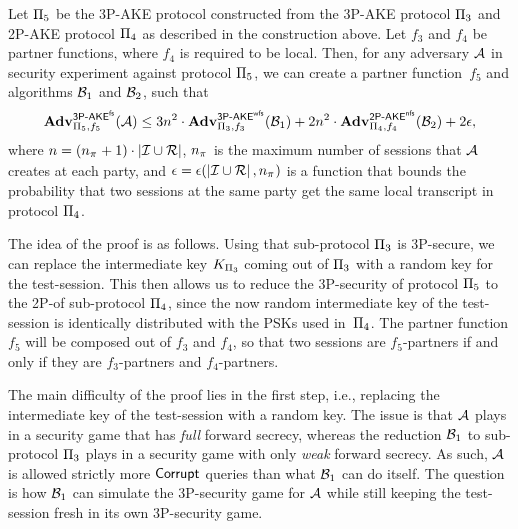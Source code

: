 \begin{theorem}\label{thm:protocol_5:3P-AKE}
Let $\protocol_5$ be the 3P-AKE protocol constructed from the 3P-AKE protocol $\protocol_3$ and 2P-AKE protocol $\protocol_4$ as described in the construction above.
Let $f_3$ and $f_4$ be partner functions,
where $f_4$ is required to be local.
Then,
for any adversary $\A$ in security experiment \akefstext against protocol $\protocol_5$,
we can create a partner function~$f_5$ and algorithms $\A[B]_1$ and $\A[B]_2$,
such that
\begin{equation}\label{eq:thm:P5:AKE}
	\adv_{\protocol_5,f_5}^{\operatorname{\mathsf{3P-\akefs}}} (\A) 
		\leq 3n^2 \cdot \adv_{\protocol_3,f_3}^{\operatorname{\mathsf{3P-\akewfs}}}(\A[B]_1) 
		+ 2n^2 \cdot \adv_{\protocol_4,f_4}^{\operatorname{\mathsf{2P-\akenfs}}}(\A[B]_2) + 2 \transcriptcollisionfunc, 
\end{equation}
where $n = (\numsessions+1) \cdot \left| \mathcal{I} \cup \mathcal{R} \right|$,
$\numsessions$ is the maximum number of sessions that $\A$ creates at each party,
and $\transcriptcollisionfunc = \transcriptcollisionfunc(\left| \mathcal{I} \cup \mathcal{R} \right|, \numsessions)$ is a function that bounds the probability that two sessions at the same party get the same local transcript in protocol $\protocol_4$.
\end{theorem}
\normalsize


The idea of the proof  is as follows.
Using that sub-protocol $\protocol_3$ is 3P-\akewfstext secure,
we can replace the intermediate key $\KDkey$ coming out of $\protocol_3$ with a random key for the test-session.
This then allows us to reduce the 3P-\akefstext security of protocol $\protocol_5$ to the 2P-\akenfstext of sub-protocol $\protocol_4$,
since the now random intermediate key of the test-session is identically distributed with the PSKs used in~$\protocol_4$. 
The partner function $f_5$ will be composed out of $f_3$ and $f_4$,
so that two sessions are $f_5$-partners if and only if they are $f_3$-partners and $f_4$-partners.

The main difficulty of the proof lies in the first step,
i.e., replacing the intermediate key of the test-session with a random key.
The issue is that $\A$ plays in a security game that has \emph{full} forward secrecy,
whereas the reduction $\A[B]_1$ to sub-protocol $\protocol_3$ plays in a security game with only \emph{weak} forward secrecy.
As such,
$\A$ is allowed strictly more $\Corrupt$ queries than what $\A[B]_1$ can do itself.
The question is how $\A[B]_1$ can simulate the 3P-\akefstext security game for $\A$
while still keeping the test-session fresh in its own 3P-\akewfstext security game. 

